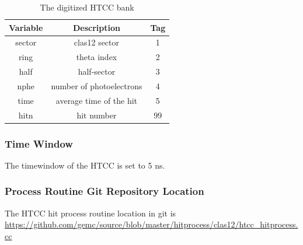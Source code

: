 \begin{table}[h]
	\begin{center}
		\begin{tabular}{| c | c | c |}
			\hline \hline
			Variable         & Description  & Tag  \\
			\hline
             sector &                                     clas12 sector  &    1   \\
             ring   &                                       theta index  &    2   \\
             half   &                                       half-sector  &    3   \\
             nphe   &                          number of photoelectrons  &    4   \\
             time   &                           average time of the hit  &    5   \\
             hitn   &                                        hit number  &   99   \\
			\hline \hline
		\end{tabular}
	\end{center}
	\caption{The digitized HTCC bank}\label{tab:htccBank}
\end{table}

\subsubsection{Time Window}
The timewindow of the HTCC is set to 5 ns.

\subsubsection{Process Routine Git Repository Location}
The HTCC hit process routine location in git is \url{https://github.com/gemc/source/blob/master/hitprocess/clas12/htcc_hitprocess.cc}
